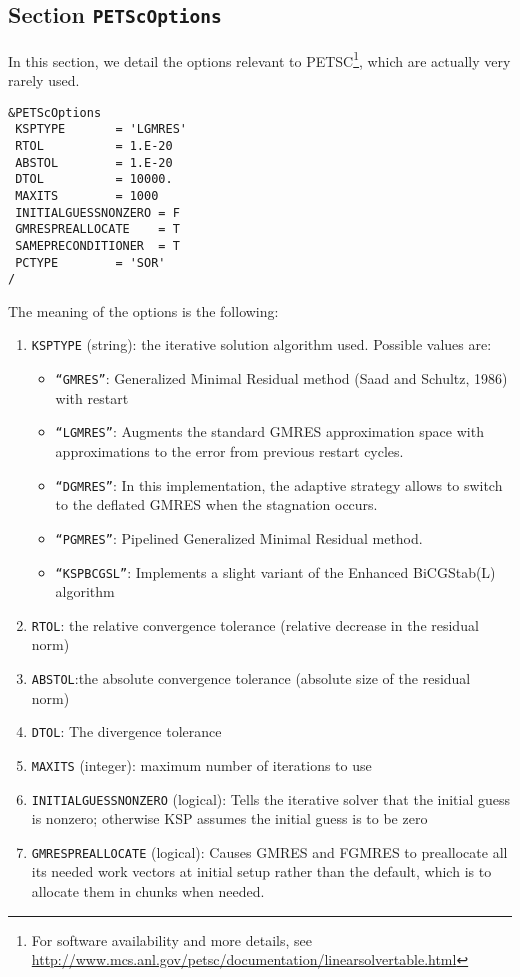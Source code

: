 \documentclass[12pt]{amsart}
\begin{document}
\subsection{Section {\tt PETScOptions}}
In this section, we detail the options relevant to PETSC\footnote{For software availability and more details, see \url{http://www.mcs.anl.gov/petsc/documentation/linearsolvertable.html}}, which are actually very rarely used.
\begin{verbatim}
&PETScOptions
 KSPTYPE       = 'LGMRES'
 RTOL          = 1.E-20    
 ABSTOL        = 1.E-20    
 DTOL          = 10000.    
 MAXITS        = 1000        
 INITIALGUESSNONZERO = F     
 GMRESPREALLOCATE    = T     
 SAMEPRECONDITIONER  = T     
 PCTYPE        = 'SOR'
/
\end{verbatim}
The meaning of the options is the following:
\begin{enumerate}
\item {\tt KSPTYPE} (string): the iterative solution algorithm used. Possible values are:
  \begin{itemize}
  \item {\tt ``GMRES''}: Generalized Minimal Residual method (Saad and Schultz, 1986) with restart
  \item {\tt ``LGMRES''}: Augments the standard GMRES approximation space with approximations to the error from previous restart cycles.
  \item {\tt ``DGMRES''}: In this implementation, the adaptive strategy allows to switch to the deflated GMRES when the stagnation occurs.
  \item {\tt ``PGMRES''}: Pipelined Generalized Minimal Residual method.
  \item {\tt ``KSPBCGSL''}: Implements a slight variant of the Enhanced BiCGStab(L) algorithm
  \end{itemize}
\item {\tt RTOL}: the relative convergence tolerance (relative decrease in the residual norm)
\item {\tt ABSTOL}:the absolute convergence tolerance (absolute size of the residual norm)
\item {\tt DTOL}: The divergence tolerance
\item {\tt MAXITS} (integer): maximum number of iterations to use
\item {\tt INITIALGUESSNONZERO} (logical): Tells the iterative solver that the initial guess is nonzero; otherwise KSP assumes the initial guess is to be zero
\item {\tt GMRESPREALLOCATE} (logical): Causes GMRES and FGMRES to preallocate all its needed work vectors at initial setup rather than the default, which is to allocate them in chunks when needed.

\end{enumerate}
\end{document}
